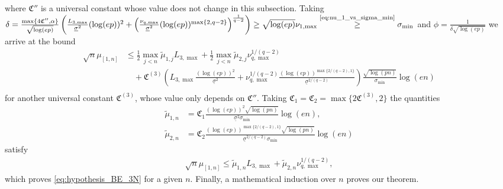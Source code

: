 \documentclass[aos]{imsart}
\begin{document}
where $\mathfrak{C}''$ is a universal constant whose value does not change in this subsection.
Taking $\delta = \frac{\max\{4 \mathfrak{C}'', \alpha\}}{\sqrt{\log(ep)}} \left( 
    \frac{{L}_{3,\max}}{\underline{\sigma}^2} (\log(ep))^2
    + \left(\frac{\nu_{q,\max}}{\underline{\sigma}^2} (\log(ep))^{\max\{2, q-2\}} \right)^{\frac{1}{q-2}} 
\right) \geq \sqrt{\log(ep)} \nu_{1,\max} \overset{ \text{\cref{eq:nu_1_vs_sigma_min}}}{\geq} \sigma_{\min} $ and $\phi = \frac{1}{\delta \sqrt{\log(ep)}}$ we arrive at the bound
\begin{equation*}
\begin{aligned}
    \sqrt{n} \mu_{[1,n]}
    & \leq \frac{1}{2} \max_{j<n}\tilde\mu_{1,j} {L}_{3,\max}
    + \frac{1}{2} \max_{j<n}\tilde\mu_{2,j} \nu_{q,\max}^{1/(q-2)} \\
    & \quad + \mathfrak{C}^{(3)} \left(
        {L}_{3,\max} \frac{(\log(ep))^2}{\underline{\sigma}^2}
        + \nu_{q,\max}^{1/(q-2)} \frac{(\log(ep))^{\max\{2/(q-2),1\}}}{\underline{\sigma}^{2/(q-2)}}
    \right)
    \frac{\sqrt{\log(p n)}}{\sigma_{\min}} \log\left(e n\right) \\
\end{aligned}
\end{equation*}
for another universal constant $\mathfrak{C}^{(3)}$, whose value only depends on $\mathfrak{C}''$.
Taking $\mathfrak{C}_1 = \mathfrak{C}_2 = \max\{2 \mathfrak{C}^{(3)}, 2\}$ the quantities
\begin{equation*}
\begin{aligned}
    \tilde\mu_{1,n} 
    & = \mathfrak{C}_1 \frac{(\log(ep))^{2}\sqrt{\log(pn)}}{\underline\sigma^2\sigma_{\min}} \log\left(e n\right), \\
    \tilde\mu_{2,n}
    & = \mathfrak{C}_2 \frac{(\log(ep))^{\max\{2/(q-2),1\}}\sqrt{\log(pn)}}{\underline\sigma^{2/(q-2)} \sigma_{\min}} \log\left(e n\right)
\end{aligned}
\end{equation*}
satisfy
\begin{equation*}
\begin{aligned}
    \sqrt{n} \mu_{[1,n]}
    \leq \tilde\mu_{1,n} {L}_{3,\max}
    + \tilde\mu_{2,n} \nu_{q,\max}^{1/(q-2)},
\end{aligned}
\end{equation*}
which proves \eqref{eq:hypothesis_BE_3N} for a given $n$.
Finally, a mathematical induction over $n$ proves our theorem.
\end{document}
